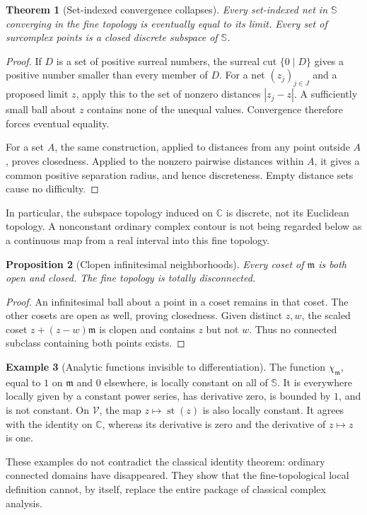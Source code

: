 \documentclass[11pt,a4paper]{article}
\newtheorem{theorem}{Theorem}[section]
\newtheorem{proposition}[theorem]{Proposition}
\theoremstyle{definition}
\newtheorem{example}[theorem]{Example}
\theoremstyle{remark}
\newcommand{\SC}{\mathbb S}
\newcommand{\C}{\mathbb C}
\newcommand{\mm}{\mathfrak m}
\newcommand{\Fin}{\mathcal V}
\newcommand{\st}{\operatorname{st}}
\begin{document}
\begin{theorem}[Set-indexed convergence collapses]\label{thm:nets}
Every set-indexed net in $\SC$ converging in the fine topology is
eventually equal to its limit. Every set of surcomplex points is a
closed discrete subspace of $\SC$.
\end{theorem}
\begin{proof}
If $D$ is a set of positive surreal numbers, the surreal cut
$\{0\mid D\}$ gives a positive number smaller than every member of
$D$. For a net $(z_j)_{j\in J}$ and a proposed limit $z$, apply this
to the set of nonzero distances $|z_j-z|$. A sufficiently small ball
about $z$ contains none of the unequal values. Convergence therefore
forces eventual equality.

For a set $A$, the same construction, applied to distances from any
point outside $A$, proves closedness. Applied to the nonzero pairwise
distances within $A$, it gives a common positive separation radius,
and hence discreteness. Empty distance sets cause no difficulty.
\end{proof}
In particular, the subspace topology induced on $\C$ is discrete, not
its Euclidean topology. A nonconstant ordinary complex contour is not
being regarded below as a continuous map from a real interval into
this fine topology.

\begin{proposition}[Clopen infinitesimal neighborhoods]\label{prop:clopen}
Every coset of $\mm$ is both open and closed. The fine topology is
totally disconnected.
\end{proposition}
\begin{proof}
An infinitesimal ball about a point in a coset remains in that coset.
The other cosets are open as well, proving closedness. Given distinct
$z,w$, the scaled coset $z+(z-w)\mm$ is clopen and contains $z$ but
not $w$. Thus no connected subclass containing both points exists.
\end{proof}

\begin{example}[Analytic functions invisible to differentiation]
The function $\chi_{\mm}$, equal to $1$ on $\mm$ and $0$ elsewhere,
is locally constant on all of $\SC$. It is everywhere locally given
by a constant power series, has derivative zero, is bounded by $1$,
and is not constant. On $\Fin$, the map $z\mapsto\st(z)$ is also
locally constant. It agrees with the identity on $\C$, whereas its
derivative is zero and the derivative of $z\mapsto z$ is one.
\end{example}
These examples do not contradict the classical identity theorem:
ordinary connected domains have disappeared. They show that the
fine-topological local definition cannot, by itself, replace the
entire package of classical complex analysis.
\end{document}
